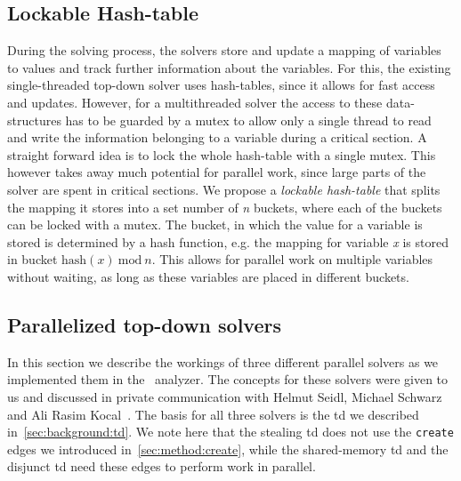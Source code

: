   \subsection{Lockable Hash-table}
  \label{sec:method:LHM}
  During the solving process, the solvers store and update a mapping of variables to values and track further information about the variables. For this, the existing single-threaded top-down solver uses hash-tables, since it allows for fast access and updates. However, for a multithreaded solver the access to these data-structures has to be guarded by a mutex to allow only a single thread to read and write the information belonging to a variable during a critical section. 
  A straight forward idea is to lock the whole hash-table with a single mutex. This however takes away much potential for parallel work, since large parts of the solver are spent in critical sections.
  We propose a \textit{lockable hash-table} that splits the mapping it stores into a set number of \textit{n} buckets, where each of the buckets can be locked with a mutex. The bucket, in which the value for a variable is stored is determined by a hash function, e.g. the mapping for variable \textit{x} is stored in bucket $\text{hash}(x)\ \text{mod}\ n$. This allows for parallel work on multiple variables without waiting, as long as these variables are placed in different buckets.

  \subsection{Parallelized top-down solvers}
  \label{sec:method:td_parallel}
  In this section we describe the workings of three different parallel solvers as we implemented them in the \gob\ analyzer. The concepts for these solvers were given to us and discussed in private communication with Helmut Seidl, Michael Schwarz and Ali Rasim Kocal~\cite{privCom}. The basis for all three solvers is the \ac{td} we described in~\autoref{sec:background:td}. We note here that the stealing \ac{td} does not use the \texttt{create} edges we introduced in~\autoref{sec:method:create}, while the shared-memory \ac{td} and the disjunct \ac{td} need these edges to perform work in parallel.

